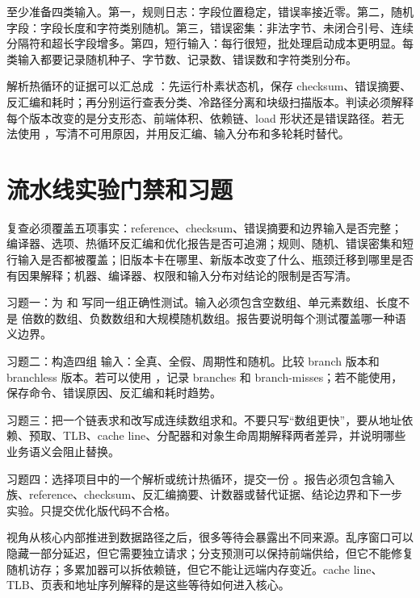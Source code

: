 至少准备四类输入。第一，规则日志：字段位置稳定，错误率接近零。第二，随机字段：字段长度和字符类别随机。第三，错误密集：非法字节、未闭合引号、连续分隔符和超长字段增多。第四，短行输入：每行很短，批处理启动成本更明显。每类输入都要记录随机种子、字节数、记录数、错误数和字符类别分布。

解析热循环的证据可以汇总成 ：先运行朴素状态机，保存 checksum、错误摘要、反汇编和耗时；再分别运行查表分类、冷路径分离和块级扫描版本。判读必须解释每个版本改变的是分支形态、前端体积、依赖链、load 形状还是错误路径。若无法使用 ，写清不可用原因，并用反汇编、输入分布和多轮耗时替代。

\section{流水线实验门禁和习题}

复查必须覆盖五项事实：reference、checksum、错误摘要和边界输入是否完整；编译器、选项、热循环反汇编和优化报告是否可追溯；规则、随机、错误密集和短行输入是否都被覆盖；旧版本卡在哪里、新版本改变了什么、瓶颈迁移到哪里是否有因果解释；机器、编译器、权限和输入分布对结论的限制是否写清。

\begin{exercisebox}
习题一：为  和  写同一组正确性测试。输入必须包含空数组、单元素数组、长度不是  倍数的数组、负数数组和大规模随机数组。报告要说明每个测试覆盖哪一种语义边界。

习题二：构造四组  输入：全真、全假、周期性和随机。比较 branch 版本和 branchless 版本。若可以使用 ，记录 branches 和 branch-misses；若不能使用，保存命令、错误原因、反汇编和耗时趋势。

习题三：把一个链表求和改写成连续数组求和。不要只写“数组更快”，要从地址依赖、预取、TLB、cache line、分配器和对象生命周期解释两者差异，并说明哪些业务语义会阻止替换。

习题四：选择项目中的一个解析或统计热循环，提交一份 。报告必须包含输入族、reference、checksum、反汇编摘要、计数器或替代证据、结论边界和下一步实验。只提交优化版代码不合格。
\end{exercisebox}

视角从核心内部推进到数据路径之后，很多等待会暴露出不同来源。乱序窗口可以隐藏一部分延迟，但它需要独立请求；分支预测可以保持前端供给，但它不能修复随机访存；多累加器可以拆依赖链，但它不能让远端内存变近。cache line、TLB、页表和地址序列解释的是这些等待如何进入核心。
